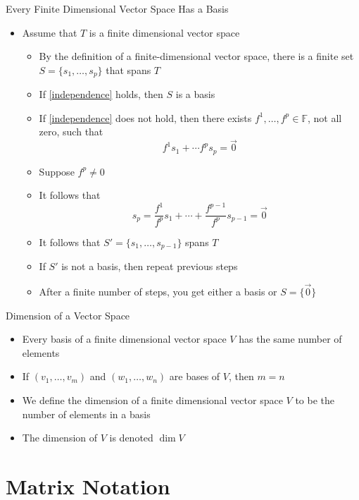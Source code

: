 \documentclass[usenames,dvipsnames,10pt]{beamer}
\newcommand\F{\mathbb{F}}
\newcommand\zero{\vec{0}}
\begin{document}
\begin{frame}
  {Every Finite Dimensional Vector Space Has a Basis}

  \begin{itemize}
  \item Assume that $T$ is a finite dimensional vector space
    \begin{itemize}
    \item By the definition of a finite-dimensional vector space,
      there is a finite set $S = \{ s_1, \dots, s_p\}$ that spans $T$
    \item If \eqref{independence} holds, then $S$ is a basis
    \item If \eqref{independence} does not hold, then there exists $f^1, \dots, f^p \in \F$, not all zero, such that
      \[ 
        f^1 s_1 + \cdots f^ps_p = \zero
      \]
    \item Suppose $f^p \ne 0$
    \item It follows that
      \[
        s_p = \frac{f^1}{f^p}s_1 + \cdots + \frac{f^{p-1}}{f^p}s_{p-1} = \zero
      \]
    \item It follows that $S' = \{ s_1, \dots, s_{p-1} \}$ spans $T$
    \item If $S'$ is not a basis, then repeat previous steps
    \item After a finite number of steps, you get either a basis or $S = \{\zero\}$
    \end{itemize}
  \end{itemize}
\end{frame}

\begin{frame}
  {Dimension of a Vector Space}

  \begin{itemize}
  \item Every basis of a finite dimensional vector space $V$ has the same number of elements
  \item If $(v_1, \dots, v_m)$ and $(w_1, \dots, w_n)$ are bases of $V$, then $m = n$
  \item We define the dimension of a finite dimensional vector space $V$ to be the number of elements in a basis
  \item The dimension of $V$ is denoted $\dim V$
  \end{itemize}
\end{frame}

\section{Matrix Notation}
\end{document}
